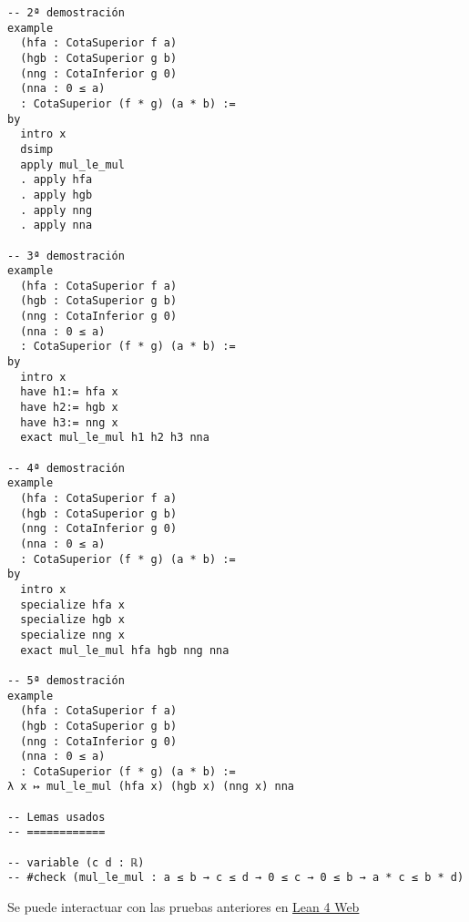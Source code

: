 \begin{verbatim}
-- 2ª demostración
example
  (hfa : CotaSuperior f a)
  (hgb : CotaSuperior g b)
  (nng : CotaInferior g 0)
  (nna : 0 ≤ a)
  : CotaSuperior (f * g) (a * b) :=
by
  intro x
  dsimp
  apply mul_le_mul
  . apply hfa
  . apply hgb
  . apply nng
  . apply nna

-- 3ª demostración
example
  (hfa : CotaSuperior f a)
  (hgb : CotaSuperior g b)
  (nng : CotaInferior g 0)
  (nna : 0 ≤ a)
  : CotaSuperior (f * g) (a * b) :=
by
  intro x
  have h1:= hfa x
  have h2:= hgb x
  have h3:= nng x
  exact mul_le_mul h1 h2 h3 nna

-- 4ª demostración
example
  (hfa : CotaSuperior f a)
  (hgb : CotaSuperior g b)
  (nng : CotaInferior g 0)
  (nna : 0 ≤ a)
  : CotaSuperior (f * g) (a * b) :=
by
  intro x
  specialize hfa x
  specialize hgb x
  specialize nng x
  exact mul_le_mul hfa hgb nng nna

-- 5ª demostración
example
  (hfa : CotaSuperior f a)
  (hgb : CotaSuperior g b)
  (nng : CotaInferior g 0)
  (nna : 0 ≤ a)
  : CotaSuperior (f * g) (a * b) :=
λ x ↦ mul_le_mul (hfa x) (hgb x) (nng x) nna

-- Lemas usados
-- ============

-- variable (c d : ℝ)
-- #check (mul_le_mul : a ≤ b → c ≤ d → 0 ≤ c → 0 ≤ b → a * c ≤ b * d)
\end{verbatim}
Se puede interactuar con las pruebas anteriores en \href{https://lean.math.hhu.de/\#url=https://raw.githubusercontent.com/jaalonso/Calculemus2/main/src/Cota\_superior\_del\_producto.lean}{Lean 4 Web}

